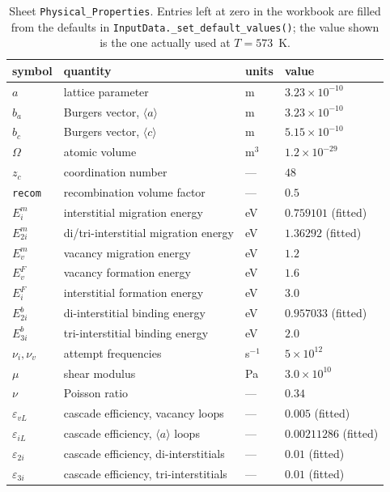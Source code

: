 \documentclass[11pt]{article}
\newcommand{\aloop}{\ensuremath{\langle a\rangle}}
\newcommand{\cloop}{\ensuremath{\langle c\rangle}}
\newcommand{\code}[1]{\texttt{\small #1}}
\begin{document}
\begin{table}[htbp]
\centering
\caption{Sheet \texttt{Physical\_Properties}. Entries left at zero in the
workbook are filled from the defaults in \code{InputData.\_set\_default\_values()};
the value shown is the one actually used at $T=573$~K.}
\label{tab:phys}
\begin{tabular}{@{}llll@{}}
\toprule
symbol & quantity & units & value \\
\midrule
$a$        & lattice parameter & m & $3.23\times10^{-10}$ \\
$b_a$      & Burgers vector, \aloop{} & m & $3.23\times10^{-10}$ \\
$b_c$      & Burgers vector, \cloop{} & m & $5.15\times10^{-10}$ \\
$\Omega$   & atomic volume & m$^3$ & $1.2\times10^{-29}$ \\
$z_c$      & coordination number & --- & $48$ \\
\code{recom} & recombination volume factor & --- & $0.5$ \\
$E^m_i$    & interstitial migration energy & eV & $0.759101$ (fitted) \\
$E^m_{2i}$ & di/tri-interstitial migration energy & eV & $1.36292$ (fitted) \\
$E^m_v$    & vacancy migration energy & eV & $1.2$ \\
$E^F_v$    & vacancy formation energy & eV & $1.6$ \\
$E^F_i$    & interstitial formation energy & eV & $3.0$ \\
$E^b_{2i}$ & di-interstitial binding energy & eV & $0.957033$ (fitted) \\
$E^b_{3i}$ & tri-interstitial binding energy & eV & $2.0$ \\
$\nu_i,\nu_v$ & attempt frequencies & s$^{-1}$ & $5\times10^{12}$ \\
$\mu$      & shear modulus & Pa & $3.0\times10^{10}$ \\
$\nu$      & Poisson ratio & --- & $0.34$ \\
$\varepsilon_{vL}$ & cascade efficiency, vacancy loops & --- & $0.005$ (fitted) \\
$\varepsilon_{iL}$ & cascade efficiency, \aloop{} loops & --- & $0.00211286$ (fitted) \\
$\varepsilon_{2i}$ & cascade efficiency, di-interstitials & --- & $0.01$ (fitted) \\
$\varepsilon_{3i}$ & cascade efficiency, tri-interstitials & --- & $0.01$ (fitted) \\
\bottomrule
\end{tabular}
\end{table}
\end{document}
